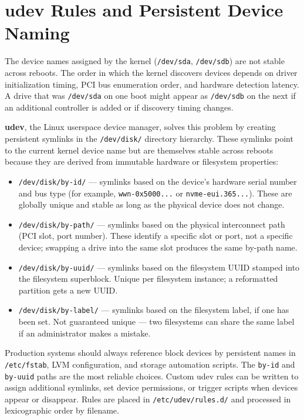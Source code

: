 \section{udev Rules and Persistent Device Naming}
\label{sec:udev}

The device names assigned by the kernel (\texttt{/dev/sda}, \texttt{/dev/sdb}) are not stable across reboots. The order in which the kernel discovers devices depends on driver initialization timing, PCI bus enumeration order, and hardware detection latency. A drive that was \texttt{/dev/sda} on one boot might appear as \texttt{/dev/sdb} on the next if an additional controller is added or if discovery timing changes.

\textbf{udev}, the Linux userspace device manager, solves this problem by creating persistent symlinks in the \texttt{/dev/disk/} directory hierarchy. These symlinks point to the current kernel device name but are themselves stable across reboots because they are derived from immutable hardware or filesystem properties:

\begin{itemize}
  \item \texttt{/dev/disk/by-id/} --- symlinks based on the device's hardware serial number and bus type (for example, \texttt{wwn-0x5000...} or \texttt{nvme-eui.365...}). These are globally unique and stable as long as the physical device does not change.
  \item \texttt{/dev/disk/by-path/} --- symlinks based on the physical interconnect path (PCI slot, port number). These identify a specific slot or port, not a specific device; swapping a drive into the same slot produces the same by-path name.
  \item \texttt{/dev/disk/by-uuid/} --- symlinks based on the filesystem UUID stamped into the filesystem superblock. Unique per filesystem instance; a reformatted partition gets a new UUID.
  \item \texttt{/dev/disk/by-label/} --- symlinks based on the filesystem label, if one has been set. Not guaranteed unique --- two filesystems can share the same label if an administrator makes a mistake.
\end{itemize}

Production systems should always reference block devices by persistent names in \texttt{/etc/fstab}, LVM configuration, and storage automation scripts. The \texttt{by-id} and \texttt{by-uuid} paths are the most reliable choices. Custom udev rules can be written to assign additional symlinks, set device permissions, or trigger scripts when devices appear or disappear. Rules are placed in \texttt{/etc/udev/rules.d/} and processed in lexicographic order by filename.

